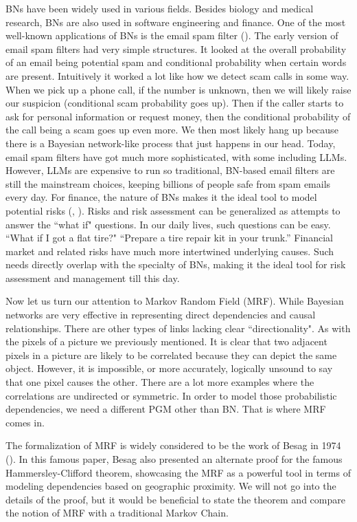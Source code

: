 BNs have been widely used in various fields. Besides biology and medical
research, BNs are also used in software engineering and finance. One of the
most well-known applications of BNs is the email spam filter
(\cite{Sahami1998}). The early version of email spam filters had very simple
structures. It looked at the overall probability of an email being potential
spam and conditional probability when certain words are present. Intuitively it
worked a lot like how we detect scam calls in some way. When we pick up a phone
call, if the number is unknown, then we will likely raise our suspicion
(conditional scam probability goes up). Then if the caller starts to ask for
personal information or request money, then the conditional probability of the
call being a scam goes up even more. We then most likely hang up because there
is a Bayesian network-like process that just happens in our head. Today, email
spam filters have got much more sophisticated, with some including LLMs.
However, LLMs are expensive to run so traditional, BN-based email filters are
still the mainstream choices, keeping billions of people safe from spam emails
every day. For finance, the nature of BNs makes it the ideal tool to model
potential risks (\cite{BNRisk2003}, \cite{Gemela2001}). Risks and risk
assessment can be generalized as attempts to answer the ``what if" questions.
In our daily lives, such questions can be easy. ``What if I got a flat tire?"
``Prepare a tire repair kit in your trunk.'' Financial market and related risks
have much more intertwined underlying causes. Such needs directly overlap with
the specialty of BNs, making it the ideal tool for risk assessment and
management till this day.

Now let us turn our attention to Markov Random Field (MRF). While Bayesian
networks are very effective in representing direct dependencies and causal
relationships. There are other types of links lacking clear ``directionality".
As with the pixels of a picture we previously mentioned. It is clear that two
adjacent pixels in a picture are likely to be correlated because they can
depict the same object. However, it is impossible, or more accurately,
logically unsound to say that one pixel causes the other. There are a lot more
examples where the correlations are undirected or symmetric. In order to model
those probabilistic dependencies, we need a different PGM other than BN. That
is where MRF comes in.

The formalization of MRF is widely considered to be the work of Besag in 1974
(\cite{Besag1974}). In this famous paper, Besag also presented an alternate
proof for the famous Hammersley-Clifford theorem, showcasing the MRF as a
powerful tool in terms of modeling dependencies based on geographic proximity.
We will not go into the details of the proof, but it would be beneficial to
state the theorem and compare the notion of MRF with a traditional Markov
Chain.

